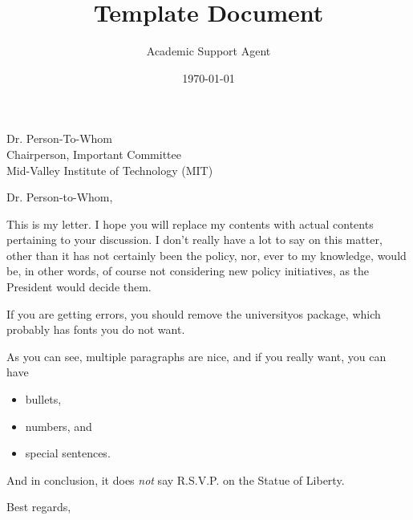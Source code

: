 \documentclass{article}
\title{Template Document}
\author{Academic Support Agent}
\date{\today}
\begin{document}
\maketitle

\begin{letter}
{Dr. Person-To-Whom\\
Chairperson, Important Committee\\
Mid-Valley Institute of Technology (MIT)}

\opening{Dr. Person-to-Whom,}

This is my letter. I hope you will replace my contents with actual contents pertaining to your discussion. I don't really have a lot to say on this matter, other than it has not certainly been the policy, nor, ever to my knowledge, would be, in other words, of course not considering new policy initiatives, as the President would decide them.

If you are getting errors, you should remove the universityos package, which probably has fonts you do not want.

As you can see, multiple paragraphs are nice, and if you really want, you can have
\begin{itemize}
	\item bullets,
	\item numbers, and
	\item special sentences.
\end{itemize}

And in conclusion, it does \emph{not} say R.S.V.P. on the Statue of Liberty.

\closing{Best regards,}

\end{letter}
\end{document}
